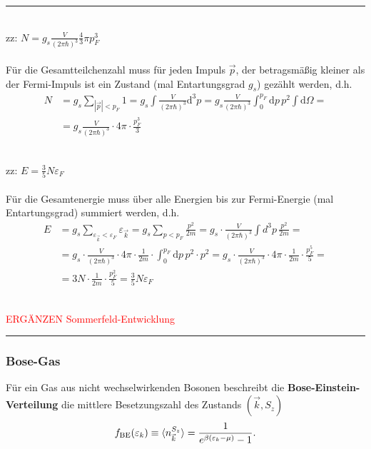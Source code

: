 \documentclass{article}
\newcommand{\diff}{\mathrm{d}}
\begin{document}
{\color{violet}
\hrule
	\\
	zz: $N = g_s \frac{V}{(2\pi\hbar)^3} \frac{4}{3}\pi p_F^3$\\
	\\
	Für die Gesamtteilchenzahl muss für jeden Impuls $\vec{p}$, der betragsmäßig kleiner als der Fermi-Impuls ist ein Zustand (mal Entartungsgrad $g_s$) gezählt werden, d.h.
		\begin{align*}
			N &= g_s \sum_{|\vec{p}| < p_F} 1 = g_s \int \frac{V}{(2\pi\hbar)^3} \diff^3p = g_s \frac{V}{(2\pi\hbar)^3} \int_0^{p_F} \diff p\, p^2 \int \diff\Omega =\\
			&= g_s \frac{V}{(2\pi\hbar)^3} \cdot 4\pi \cdot \frac{p_F^3}{3}
		\end{align*}
	
	\\
	zz: $E = \frac{3}{5} N \varepsilon_F$\\
	\\
	Für die Gesamtenergie muss über alle Energien bis zur Fermi-Energie (mal Entartungsgrad) summiert werden, d.h.
		\begin{align*}
			E &= g_s \sum_{\varepsilon_{\vec{k}} < \varepsilon_F} \varepsilon_{\vec{k}} = g_s \sum_{p < p_F} \frac{p^2}{2m} = g_s \cdot \frac{V}{(2\pi\hbar)^3} \int d^3p\, \frac{p^2}{2m} = \\
			&= g_s \cdot \frac{V}{(2\pi\hbar)^3} \cdot 4\pi \cdot \frac{1}{2m} \cdot \int_0^{p_F} \diff p\, p^2\cdot p^2 = g_s \cdot \frac{V}{(2\pi\hbar)^3} \cdot 4\pi \cdot \frac{1}{2m} \cdot \frac{p_F^5}{5} = \\
			&= 3N \cdot \frac{1}{2m} \cdot \frac{p_F^2}{5} = \frac{3}{5}N\varepsilon_F
		\end{align*}


	\\
	\textcolor{red}{ERGÄNZEN Sommerfeld-Entwicklung}
\hrule
}


\newpage


\subsubsection{Bose-Gas}
Für ein Gas aus nicht wechselwirkenden Bosonen beschreibt die \textbf{Bose-Einstein-Verteilung} die mittlere Besetzungszahl des Zustands $(\vec{k},S_z)$
	\begin{equation}
		f_\text{BE}(\varepsilon_{k}) \equiv \braket{n_{\vec{k}}^{S_z}} = \frac{1}{e^{\beta(\varepsilon_k - \mu)} - 1}.
	\end{equation}
\end{document}
